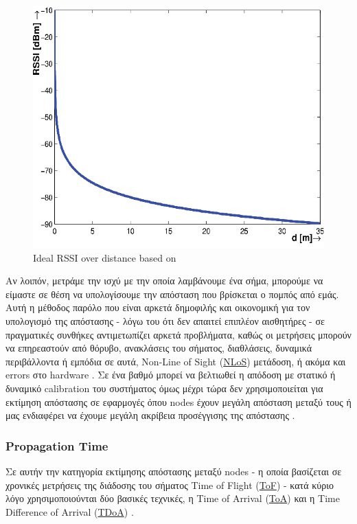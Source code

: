 \begin{figure} [H]
	\centering
	\includegraphics[scale=0.32]{Images/Theoretical-Background/Ideal-RSSI-over-distance.png}
	\decoRule
	\caption[Ideal RSSI over distance]{Ideal RSSI over distance based on \cite{ideal-rssi-model}}
	\label{fig:Ideal-RSSI-over-distance}
\end{figure}

Αν λοιπόν, μετράμε την ισχύ με την οποία λαμβάνουμε ένα σήμα, μπορούμε να είμαστε σε θέση να υπολογίσουμε την απόσταση που βρίσκεται
ο πομπός από εμάς.
Αυτή η μέθοδος παρόλο που είναι αρκετά δημοφιλής και οικονομική για τον υπολογισμό της απόστασης
- λόγω του ότι δεν απαιτεί επιπλέον αισθητήρες - σε πραγματικές 
συνθήκες αντιμετωπίζει αρκετά προβλήματα, καθώς οι μετρήσεις μπορούν να επηρεαστούν από θόρυβο,
ανακλάσεις του σήματος, διαθλάσεις, δυναμικά περιβάλλοντα ή εμπόδια σε αυτά, Non-Line of Sight (\hyperref[abbr:NLoS]{NLoS}) μετάδοση, 
ή ακόμα και errors στο hardware 
\cite{wsn-Localization-systems} \cite{ideal-rssi-model}.
Σε ένα βαθμό μπορεί να βελτιωθεί η απόδοση με στατικό ή δυναμικό calibration του συστήματος 
όμως μέχρι τώρα δεν χρησιμοποιείται για εκτίμηση απόστασης σε εφαρμογές όπου nodes έχουν μεγάλη
απόσταση μεταξύ τους ή μας ενδιαφέρει να έχουμε μεγάλη ακρίβεια προσέγγισης της απόστασης \cite{ideal-rssi-model}.

\subsubsection{Propagation Time}
Σε αυτήν την κατηγορία εκτίμησης απόστασης μεταξύ nodes - η οποία βασίζεται σε χρονικές μετρήσεις της διάδοσης του σήματος Time of Flight (\hyperref[abbr:ToF]{ToF})
- κατά κύριο λόγο χρησιμοποιούνται δύο βασικές τεχνικές, η Time of Arrival (\hyperref[abbr:ToA]{ToA}) και η Time 
Difference of Arrival (\hyperref[abbr:TDoA]{TDoA}) \cite{wsn-Localization-systems}. 

